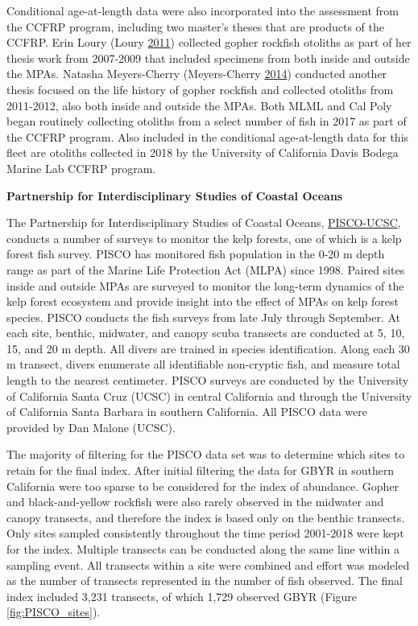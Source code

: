 \documentclass[12pt,]{article}
\begin{document}
Conditional age-at-length data were also incorporated into the
assessment from the CCFRP program, including two master's theses that
are products of the CCFRP. Erin Loury (Loury
\protect\hyperlink{ref-Loury2011}{2011}) collected gopher rockfish
otoliths as part of her thesis work from 2007-2009 that included
specimens from both inside and outside the MPAs. Natasha Meyers-Cherry
(Meyers-Cherry \protect\hyperlink{ref-MeyersCherry2014}{2014}) conducted
another thesis focused on the life history of gopher rockfish and
collected otoliths from 2011-2012, also both inside and outside the
MPAs. Both MLML and Cal Poly began routinely collecting otoliths from a
select number of fish in 2017 as part of the CCFRP program. Also
included in the conditional age-at-length data for this fleet are
otoliths collected in 2018 by the University of California Davis Bodega
Marine Lab CCFRP program.

\textbf{Partnership for Interdisciplinary Studies of Coastal Oceans}

The Partnership for Interdisciplinary Studies of Coastal Oceans,
\href{http://www.piscoweb.org/kelp-forest-study}{PISCO-UCSC}, conducts a
number of surveys to monitor the kelp forests, one of which is a kelp
forest fish survey. PISCO has monitored fish population in the 0-20 m
depth range as part of the Marine Life Protection Act (MLPA) since 1998.
Paired sites inside and outside MPAs are surveyed to monitor the
long-term dynamics of the kelp forest ecosystem and provide insight into
the effect of MPAs on kelp forest species. PISCO conducts the fish
surveys from late July through September. At each site, benthic,
midwater, and canopy scuba transects are conducted at 5, 10, 15, and 20
m depth. All divers are trained in species identification. Along each 30
m transect, divers enumerate all identifiable non-cryptic fish, and
measure total length to the nearest centimeter. PISCO surveys are
conducted by the University of California Santa Cruz (UCSC) in central
California and through the University of California Santa Barbara in
southern California. All PISCO data were provided by Dan Malone (UCSC).

The majority of filtering for the PISCO data set was to determine which
sites to retain for the final index. After initial filtering the data
for GBYR in southern California were too sparse to be considered for the
index of abundance. Gopher and black-and-yellow rockfish were also
rarely observed in the midwater and canopy transects, and therefore the
index is based only on the benthic transects. Only sites sampled
consistently throughout the time period 2001-2018 were kept for the
index. Multiple transects can be conducted along the same line within a
sampling event. All transects within a site were combined and effort was
modeled as the number of transects represented in the number of fish
observed. The final index included 3,231 transects, of which 1,729
observed GBYR (Figure \ref{fig:PISCO_sites}).
\end{document}
